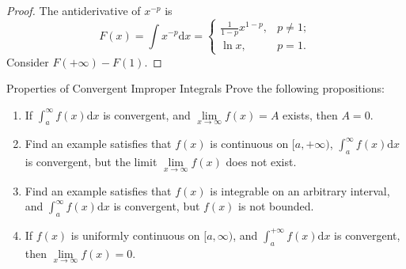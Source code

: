 \begin{proof}
  The antiderivative of $x^{-p}$ is
  \begin{equation}
    F(x) = \int x^{-p}\mathrm{d} x =
    \begin{cases}
      \frac{1}{1-p} x^{1-p}, & p \neq 1;\\
      \ln x, & p =1.
    \end{cases}
  \end{equation}
  Consider $F(+\infty) - F(1)$.
\end{proof}

\begin{example}{Properties of Convergent Improper Integrals}{}
  Prove the following propositions:
  \begin{enumerate}
  \item If $\int_a^{\infty}f(x)\mathrm{d} x$ is convergent,
    and $\lim \limits _{x \rightarrow \infty}f(x) = A$ exists,
    then $A = 0$.
  \item Find an example satisfies that $f(x)$ is continuous on $[a, +\infty)$,
    $\int_a^{\infty}f(x)\mathrm{d} x$ is convergent,
    but the limit $\lim \limits _{x \rightarrow \infty}f(x)$ does not exist.
  \item Find an example satisfies that $f(x)$ is integrable on an arbitrary interval,
    and $\int_a^{\infty}f(x)\mathrm{d} x$ is convergent, but $f(x)$ is not bounded.
  \item If $f(x)$ is uniformly continuous on $[a, \infty)$,
    and $\int_a^{+\infty}f(x)\mathrm{d} x$ is convergent,
    then $\lim \limits _{x \rightarrow \infty}f(x) = 0$.
  \end{enumerate}
\end{example}

